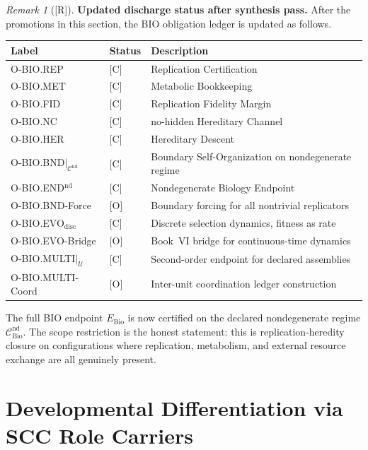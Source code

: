 \documentclass[12pt,oneside]{amsbook}
\theoremstyle{plain}
\theoremstyle{definition}
\theoremstyle{remark}
\newtheorem{remark}[theorem]{Remark}
\newcommand{\status}[1]{\textup{[#1]}}
\begin{document}
\begin{remark}[\status{R}]\label{rem:bio-closure-updated}
\textbf{Updated discharge status after synthesis pass.}
After the promotions in this section, the BIO obligation ledger
is updated as follows.

\medskip
\noindent
\begin{tabular}{|l|l|p{7.5cm}|}
\hline
\textbf{Label} & \textbf{Status} & \textbf{Description} \\
\hline
O-BIO.REP & [C] & Replication Certification \\
O-BIO.MET & [C] & Metabolic Bookkeeping \\
O-BIO.FID & [C] & Replication Fidelity Margin \\
O-BIO.NC & [C] & no-hidden Hereditary Channel \\
O-BIO.HER & [C] & Hereditary Descent \\
O-BIO.BND$|_{\mathcal{C}^{\mathrm{nd}}}$ & [C] & Boundary Self-Organization on nondegenerate regime \\
O-BIO.END$^{\mathrm{nd}}$ & [C] & Nondegenerate Biology Endpoint \\
O-BIO.BND-Force & [O] & Boundary forcing for all nontrivial replicators \\
O-BIO.EVO$_{\mathrm{disc}}$ & [C] & Discrete selection dynamics, fitness as rate \\
O-BIO.EVO-Bridge & [O] & Book~VI bridge for continuous-time dynamics \\
O-BIO.MULTI$|_{\mathcal{U}}$ & [C] & Second-order endpoint for declared assemblies \\
O-BIO.MULTI-Coord & [O] & Inter-unit coordination ledger construction \\
\hline
\end{tabular}

\medskip
The full BIO endpoint $E_{\mathrm{Bio}}$ is now certified on the
declared nondegenerate regime $\mathcal{C}_{\mathrm{Bio}}^{\mathrm{nd}}$.
The scope restriction is the honest statement: this is replication-heredity
closure on configurations where replication, metabolism, and external
resource exchange are all genuinely present.
\end{remark}

\section{Developmental Differentiation via SCC Role Carriers}
\label{sec:bio-DEV}
\end{document}
